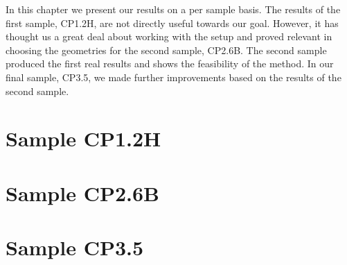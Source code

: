 In this chapter we present our results on a per sample basis. The results of the first sample, CP1.2H, are not directly useful towards our goal. However, it has thought us a great deal about working with the setup and proved relevant in choosing the geometries for the second sample, CP2.6B. The second sample produced the first real results and shows the feasibility of the method. In our final sample, CP3.5, we made further improvements based on the results of the second sample.

\section{Sample CP1.2H}


\newpage
\section{Sample CP2.6B}


\newpage
\section{Sample CP3.5}
